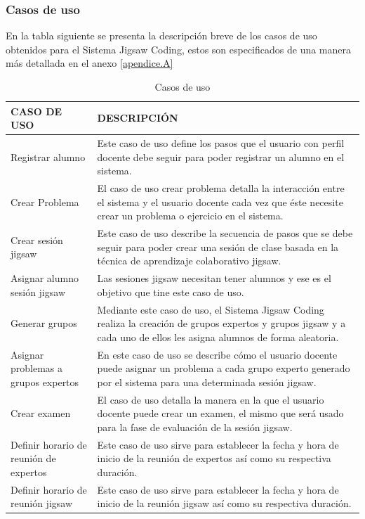 \subsubsection{Casos de uso}
En la tabla siguiente se presenta la descripción breve de los casos de uso obtenidos para el Sistema Jigsaw Coding, estos son especificados de una manera más detallada en el anexo \ref{apendice.A}
\begin{longtable}{|L{4cm}|L{9cm}|}
	\caption{Casos de uso}
	\label{tab:cap4_casosdeuso}\\
	\hline
	CASO DE USO & DESCRIPCIÓN \\
	\hline
	Registrar alumno & Este caso de uso define los pasos que el usuario con perfil docente debe seguir para poder registrar un alumno en el sistema.\\
	\hline
	Crear Problema & El caso de uso crear problema detalla la interacción entre el sistema y el usuario docente cada vez que éste necesite crear un problema o ejercicio en el sistema.\\
	\hline
	Crear sesión jigsaw & Este caso de uso describe la secuencia de pasos que se debe seguir para poder crear una sesión de clase basada en la técnica de aprendizaje colaborativo jigsaw.\\
	\hline
	Asignar alumno sesión jigsaw & Las sesiones jigsaw necesitan tener alumnos y ese es el objetivo que tine este caso de uso.\\
	\hline
	Generar grupos & Mediante este caso de uso, el Sistema Jigsaw Coding realiza la creación de grupos expertos y grupos jigsaw y a cada uno de ellos les asigna alumnos de forma aleatoria.\\
	\hline
	Asignar problemas a grupos expertos & En este caso de uso se describe cómo el usuario docente puede asignar un problema a cada grupo experto generado por el sistema para una determinada sesión jigsaw.\\
	\hline
	Crear examen & El caso de uso detalla la manera en la que el usuario docente puede crear un examen, el mismo que será usado para la fase de evaluación de la sesión jigsaw.\\
	\hline
	Definir horario de reunión de expertos & Este caso de uso sirve para establecer la fecha y hora de inicio de la reunión de expertos así como su respectiva duración.\\
	\hline
	Definir horario de reunión jigsaw & Este caso de uso sirve para establecer la fecha y hora de inicio de la reunión jigsaw así como su respectiva duración.\\

\end{longtable}
